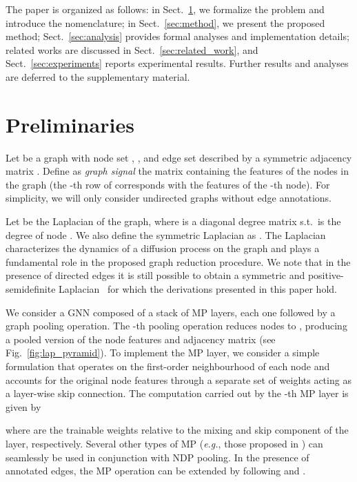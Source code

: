 \documentclass[journal]{IEEEtran}
\begin{document}
The paper is organized as follows: in Sect.~\ref{sec:preliminaries}, we formalize the problem and introduce the nomenclature; in Sect.~\ref{sec:method}, we present the proposed method; Sect.~\ref{sec:analysis} provides formal analyses and implementation details; related works are discussed in Sect.~\ref{sec:related_work}, and Sect.~\ref{sec:experiments} reports experimental results.
Further results and analyses are deferred to the supplementary material.

\section{Preliminaries}
\label{sec:preliminaries}
Let  be a graph with node set , , and edge set  described by a symmetric adjacency matrix . 
Define as \textit{graph signal}  the matrix containing the features of the nodes in the graph (the -th row of  corresponds with the features  of the -th node).
For simplicity, we will only consider undirected graphs without edge annotations. 

Let  be the Laplacian of the graph, where  is a diagonal degree matrix s.t.\  is the degree of node .
We also define the symmetric Laplacian as .
The Laplacian characterizes the dynamics of a diffusion process on the graph and plays a fundamental role in the proposed graph reduction procedure. 
We note that in the presence of directed edges it is still possible to obtain a symmetric and positive-semidefinite Laplacian~\cite{chung2005laplacians, sandryhaila2013discrete} for which the derivations presented in this paper hold.

We consider a GNN composed of a stack of MP layers, each one followed by a graph pooling operation.
The -th pooling operation reduces  nodes to , producing a pooled version of the node features  and adjacency matrix  (see Fig.~\ref{fig:lap_pyramid}).
To implement the MP layer, we consider a simple formulation that operates on the first-order neighbourhood of each node and accounts for the original node features through a separate set of weights acting as a layer-wise skip connection. 
The computation carried out by the -th MP layer is given by

where  are the trainable weights relative to the mixing and skip component of the layer, respectively. 
Several other types of MP (\textit{e.g.}, those proposed in \cite{defferrard2016convolutional, kipf2016semi, velickovic2017graph, bianchi2019graph, xu2018powerful, hamilton2017inductive}) can seamlessly be used in conjunction with NDP pooling.
In the presence of annotated edges, the MP operation can be extended by following \cite{simonovsky2017dynamic} and \cite{schlichtkrull2018modeling}.
\end{document}
